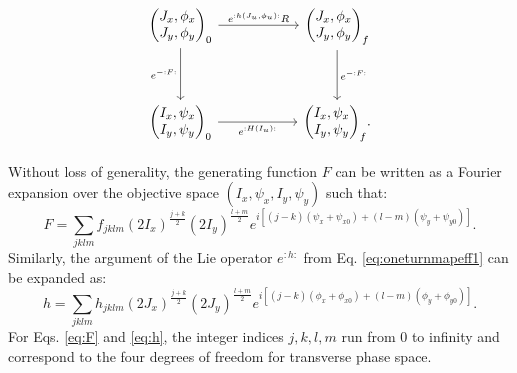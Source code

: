 \begin{equation}\begin{tikzcd}
    {\begin{pmatrix} J_x,\phi_x \\ J_y,\phi_y \end{pmatrix}_0} & {} & {\begin{pmatrix} J_x,\phi_x \\ J_y,\phi_y \end{pmatrix}_{f}} \\
    \\
    {\begin{pmatrix} I_x,\psi_x \\ I_y,\psi_y \end{pmatrix}_0} && {\begin{pmatrix} I_x,\psi_x \\ I_y,\psi_y \end{pmatrix}_{f}}
    \arrow["{e^{:h(J_u,\phi_u):}R}", from=1-1, to=1-3]
    \arrow["{e^{-:F:}}"', from=1-1, to=3-1]
    \arrow["{e^{:H(I_u):}}"', from=3-1, to=3-3]
    \arrow["{e^{-:F:}}", from=1-3, to=3-3]
    .
\end{tikzcd}\end{equation}

Without loss of generality, the generating function $F$ can be written as a Fourier expansion over the objective space $(I_x,\psi_x,I_y,\psi_y)$ such that:
\begin{equation}
    \label{eq:F}
    F=\sum_{jklm} f_{jklm} \left( 2 I_x\right)^{\frac{j+k}{2}} \left( 2 I_y\right)^{\frac{l+m}{2}} e^{i\left[ \left( j-k \right)\left( \psi_x+\psi_{x0} \right)+ \left( l-m \right) \left( \psi_y+\psi_{y0} \right)\right]}.
\end{equation}
Similarly, the argument of the Lie operator $e^{:h:}$ from Eq. \ref{eq:oneturnmapeff1} can be expanded as:
\begin{equation}
    \label{eq:h}
    h=\sum_{jklm} h_{jklm} \left( 2 J_x\right)^{\frac{j+k}{2}} \left( 2 J_y\right)^{\frac{l+m}{2}} e^{i\left[ \left( j-k \right)\left( \phi_x+\phi_{x0} \right)+ \left( l-m \right) \left( \phi_y+\phi_{y0} \right)\right]}.
\end{equation}
For Eqs. \ref{eq:F} and \ref{eq:h}, the integer indices $j,k,l,m$ run from $0$ to infinity and correspond to the four degrees of freedom for transverse phase space.   

